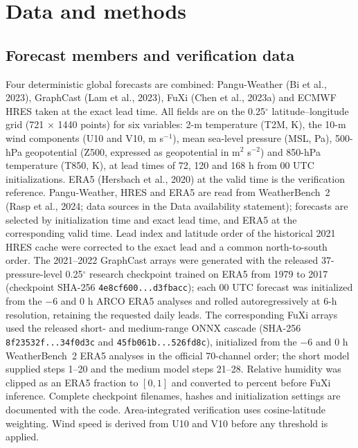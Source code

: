 \documentclass[12pt]{article}
\newcommand{\mps}{m s$^{-1}$}
\begin{document}
\section{Data and methods}
\label{sec:methods}

\subsection{Forecast members and verification data}
\label{sec:data}

Four deterministic global forecasts are combined: Pangu-Weather (Bi et al., 2023), GraphCast (Lam et al., 2023), FuXi (Chen et al., 2023a) and ECMWF HRES taken at the exact lead time. All fields are on the 0.25$^{\circ}$ latitude--longitude grid (721 $\times$ 1440 points) for six variables: 2-m temperature (T2M, K), the 10-m wind components (U10 and V10, \mps), mean sea-level pressure (MSL, Pa), 500-hPa geopotential (Z500, expressed as geopotential in m$^{2}$ s$^{-2}$) and 850-hPa temperature (T850, K), at lead times of 72, 120 and 168 h from 00 UTC initializations. ERA5 (Hersbach et al., 2020) at the valid time is the verification reference. Pangu-Weather, HRES and ERA5 are read from WeatherBench~2 (Rasp et al., 2024; data sources in the Data availability statement); forecasts are selected by initialization time and exact lead time, and ERA5 at the corresponding valid time. Lead index and latitude order of the historical 2021 HRES cache were corrected to the exact lead and a common north-to-south order. The 2021--2022 GraphCast arrays were generated with the released 37-pressure-level 0.25$^{\circ}$ research checkpoint trained on ERA5 from 1979 to 2017 (checkpoint SHA-256 \texttt{4e8cf600...d3fbacc}); each 00 UTC forecast was initialized from the $-6$ and 0 h ARCO ERA5 analyses and rolled autoregressively at 6-h resolution, retaining the requested daily leads. The corresponding FuXi arrays used the released short- and medium-range ONNX cascade (SHA-256 \texttt{8f23532f...34f0d3c} and \texttt{45fb061b...526fd8c}), initialized from the $-6$ and 0 h WeatherBench~2 ERA5 analyses in the official 70-channel order; the short model supplied steps 1--20 and the medium model steps 21--28. Relative humidity was clipped as an ERA5 fraction to $[0,1]$ and converted to percent before FuXi inference. Complete checkpoint filenames, hashes and initialization settings are documented with the code. Area-integrated verification uses cosine-latitude weighting. Wind speed is derived from U10 and V10 before any threshold is applied.
\end{document}
